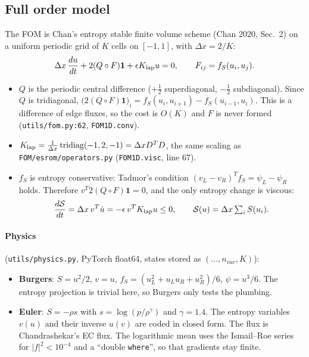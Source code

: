 \documentclass[11pt,a4paper]{article}
\newcommand{\code}[1]{\texttt{\small #1}}
\newcommand{\Sc}{\mathcal S}
\begin{document}
\subsection{Full order model}
The FOM is Chan's entropy stable finite volume scheme (Chan 2020, Sec.~2) on a uniform periodic grid of $K$ cells on $[-1,1]$, with $\Delta x = 2/K$:
\begin{equation}\label{eq:fom}
\Delta x\,\frac{du}{dt} + 2(Q\circ F)\mathbf 1 + \epsilon K_{\rm lap}u = 0,\qquad F_{ij}=f_S(u_i,u_j).
\end{equation}
\begin{itemize}
\item $Q$ is the periodic central difference ($+\tfrac12$ superdiagonal, $-\tfrac12$ subdiagonal). Since $Q$ is tridiagonal, $\big(2(Q\circ F)\mathbf 1\big)_i = f_S(u_i,u_{i+1})-f_S(u_{i-1},u_i)$. This is a difference of edge fluxes, so the cost is $O(K)$ and $F$ is never formed (\code{utils/fom.py:62}, \code{FOM1D.conv}).
\item $K_{\rm lap} = \tfrac{1}{\Delta x}\,\mathrm{tridiag}(-1,2,-1)=\Delta x D^TD$, the same scaling as \code{FOM/esrom/operators.py} (\code{FOM1D.visc}, line 67).
\item $f_S$ is entropy conservative: Tadmor's condition $(v_L-v_R)^Tf_S=\psi_L-\psi_R$ holds. Therefore $v^T 2(Q\circ F)\mathbf 1 = 0$, and the only entropy change is viscous:
\begin{equation}\label{eq:fomdiss}
\frac{d\Sc}{dt} = \Delta x\,v^T\dot u = -\epsilon\, v^TK_{\rm lap}u \le 0,\qquad \Sc(u)=\Delta x\textstyle\sum_i S(u_i).
\end{equation}
\end{itemize}

\paragraph{Physics} (\code{utils/physics.py}, PyTorch float64, states stored as $(\dots,n_{var},K)$):
\begin{itemize}
\item \textbf{Burgers}: $S=u^2/2$, $v=u$, $f_S=(u_L^2+u_Lu_R+u_R^2)/6$, $\psi=u^3/6$. The entropy projection is trivial here, so Burgers only tests the plumbing.
\item \textbf{Euler}: $S=-\rho s$ with $s=\log(p/\rho^\gamma)$ and $\gamma=1.4$. The entropy variables $v(u)$ and their inverse $u(v)$ are coded in closed form. The flux is Chandrashekar's EC flux. The logarithmic mean uses the Ismail--Roe series for $|f|^2<10^{-4}$ and a ``double \code{where}'', so that gradients stay finite.
\end{itemize}
\end{document}
